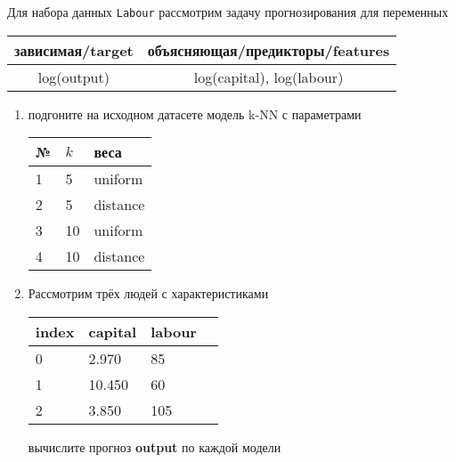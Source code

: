 \begin{exercise}
Для набора данных \texttt{Labour} рассмотрим задачу прогнозирования
для переменных
\begin{center}
	\begin{tabular}{|c|c|}\hline
		зависимая/target & объясняющая/предикторы/features \\ \hline
		log(output) & log(capital), log(labour) \\ \hline
	\end{tabular}
\end{center}
\begin{enumerate}
	\item подгоните на исходном датасете модель k-NN с параметрами
	\begin{center}
		\begin{tabular}{|l|l|l|}\hline
		№ & \(k\) & веса \\ \hline
		1 & 5 & uniform \\
		2 & 5 & distance \\
		3 & 10 & uniform \\
		4 & 10 & distance \\ \hline
		\end{tabular}
	\end{center}
	\item Рассмотрим трёх людей с характеристиками
	\begin{center}
		\begin{tabular}{|l||l||l|l|}\hline
			index & capital & labour \\ \hline\hline
			0 & 2.970 & 85 \\
			1 & 10.450 & 60  \\
			2 & 3.850 & 105 \\ \hline
		\end{tabular}
	\end{center}
	вычислите прогноз \textbf{output} по каждой модели
\end{enumerate}
\end{exercise}

